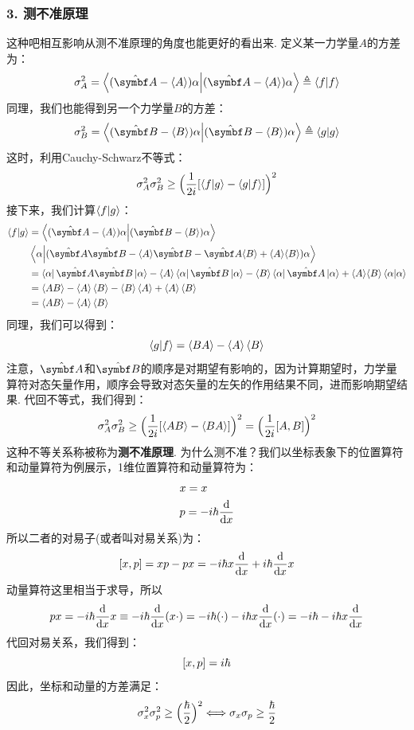\subsubsection{3. 测不准原理}
这种吧相互影响从测不准原理的角度也能更好的看出来. 定义某一力学量\(A\)的方差为：
\[
\sigma_{A}^{2} = \bra{(\uv{A}-\langle A\rangle)\al}\ket{(\uv{A}-\langle A\rangle)\al}\triangleq \bra{f}\ket{f}
\]
同理，我们也能得到另一个力学量\(B\)的方差：
\[
\sigma_{B}^{2} = \bra{(\uv{B}-\langle B\rangle)\al}\ket{(\uv{B}-\langle B\rangle)\al}\triangleq \bra{g}\ket{g}
\]
这时，利用Cauchy-Schwarz不等式：
\[
\sigma_{A}^2\sigma_{B}^2 \geq \Big(\frac{1}{2i}[\bra{f}\ket{g} - \bra{g}\ket{f}]\Big)^{2}
\]
接下来，我们计算\(\bra{f}\ket{g}\)：
\begin{align*}
\braket{f}{g}
& = \bra{(\uv{A}-\langle A\rangle)\al}\ket{(\uv{B}-\langle B\rangle)\al} \\
& \bra{\al}\ket{(\uv{A}\uv{B} - \langle A\rangle\uv{B} -\uv{A}\langle B\rangle + \langle A\rangle\langle B\rangle)\al} \\
& = \bra{\al}\uv{A}\uv{B}\ket{\al} - \langle A\rangle\bra{\al}\uv{B}\ket{\al} - \langle B\rangle\bra{\al}\uv{A}\ket{\al} + \langle A\rangle\langle B\rangle \bra{\al}\ket{\al} \\
& = \avg{AB} - \avg{A}\avg{B} - \avg{B}\avg{A} + \avg{A}\avg{B} \\
& = \avg{AB} - \avg{A}\avg{B}
\end{align*}
同理，我们可以得到：
\[
\bra{g}\ket{f} = \langle BA\rangle - \left\langle{A}\right\rangle\left\langle{B}\right\rangle
\]
注意，\(\uv{A}\)和\(\uv{B}\)的顺序是对期望有影响的，因为计算期望时，力学量算符对态矢量作用，顺序会导致对态矢量的左矢的作用结果不同，进而影响期望结果. 代回不等式，我们得到：
\[
\sigma_{A}^2\sigma_{B}^2 \geq \Big(\frac{1}{2i}[\left\langle{AB}\right\rangle-\left\langle{BA}\right\rangle]\Big)^2=\Big(\frac{1}{2i}[A,B]\Big)^{2}
\]
这种不等关系称被称为\textbf{测不准原理}. 为什么测不准？我们以坐标表象下的位置算符和动量算符为例展示，1维位置算符和动量算符为：
\begin{align*}
& {x} = x \\
& {p} = -i\hbar\frac{\dd}{\dd x}
\end{align*}
所以二者的对易子(或者叫对易关系)为：
\[
[{x},{p}] = xp - px = -i\hbar x\frac{\dd}{\dd x} + i\hbar\frac{\dd}{\dd x}x 
\]
动量算符这里相当于求导，所以
\[
px= -i\hbar\frac{\dd}{\dd x}x \equiv -i\hbar\frac{\dd}{\dd x}(x\cdot) = -i\hbar(\cdot) - i\hbar x\frac{\dd}{\dd x}(\cdot) = -i\hbar - i\hbar x\frac{\dd}{\dd x}
\]
代回对易关系，我们得到：
\[
[x,p] = i\hbar
\]
因此，坐标和动量的方差满足：
\[
\sigma_{x}^2\sigma_{p}^2 \geq \Big(\frac{\hbar}{2}\Big)^2 \Longleftrightarrow \sigma_{x}\sigma_{p} \geq \frac{\hbar}{2}
\]
